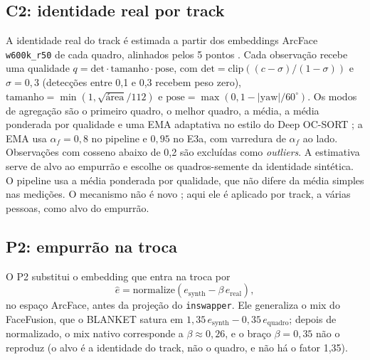 \subsection{C2: identidade real por track}

A identidade real do track é estimada a partir dos embeddings ArcFace \texttt{w600k\_r50} de cada quadro, alinhados pelos 5 pontos \citep{arcface}. Cada observação recebe uma qualidade $q = \mathrm{det}\cdot\mathrm{tamanho}\cdot\mathrm{pose}$, com $\mathrm{det} = \mathrm{clip}((c - \sigma)/(1-\sigma))$ e $\sigma = 0{,}3$ (detecções entre 0,1 e 0,3 recebem peso zero), $\mathrm{tamanho} = \min(1, \sqrt{\text{área}}/112)$ e $\mathrm{pose} = \max(0, 1 - |\mathrm{yaw}|/60^\circ)$. Os modos de agregação são o primeiro quadro, o melhor quadro, a média, a média ponderada por qualidade e uma EMA adaptativa no estilo do Deep OC-SORT \citep{deepocsort}; a EMA usa $\alpha_f = 0{,}8$ no pipeline e $0{,}95$ no E3a, com varredura de $\alpha_f$ ao lado. Observações com cosseno abaixo de 0,2 são excluídas como \emph{outliers}. A estimativa serve de alvo ao empurrão e escolhe os quadros-semente da identidade sintética. O pipeline usa a média ponderada por qualidade, que não difere da média simples nas medições. O mecanismo não é novo \citep{nan,qan,zhu-bmsb}; aqui ele é aplicado por track, a várias pessoas, como alvo do empurrão.

\subsection{P2: empurrão na troca}

O P2 substitui o embedding que entra na troca por
\begin{equation}
\hat{e} = \mathrm{normalize}(e_{\mathrm{synth}} - \beta\, e_{\mathrm{real}}),
\end{equation}
no espaço ArcFace, antes da projeção do \texttt{inswapper}. Ele generaliza o mix do FaceFusion, que o BLANKET satura em $1{,}35\,e_{\mathrm{synth}} - 0{,}35\,e_{\mathrm{quadro}}$; depois de normalizado, o mix nativo corresponde a $\beta \approx 0{,}26$, e o braço $\beta = 0{,}35$ não o reproduz (o alvo é a identidade do track, não o quadro, e não há o fator 1,35).

